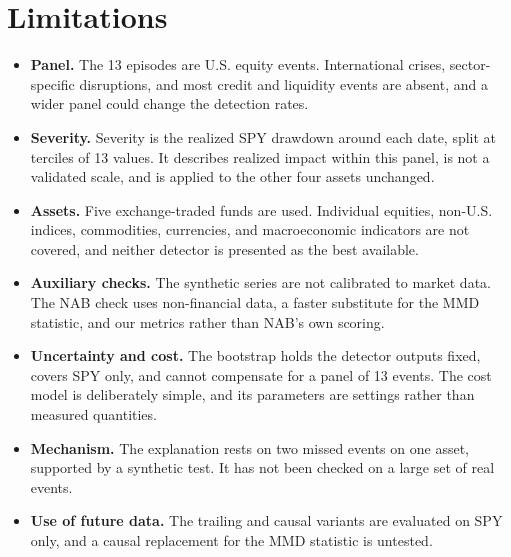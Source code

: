 \documentclass[pdflatex,sn-mathphys-num,iicol]{sn-jnl}
\begin{document}
\section{Limitations}
\label{sec:limits}
\begin{itemize}
\item \textbf{Panel.} The 13 episodes are U.S. equity events. International crises, sector-specific disruptions, and most credit and liquidity events are absent, and a wider panel could change the detection rates.
\item \textbf{Severity.} Severity is the realized SPY drawdown around each date, split at terciles of 13 values. It describes realized impact within this panel, is not a validated scale, and is applied to the other four assets unchanged.
\item \textbf{Assets.} Five exchange-traded funds are used. Individual equities, non-U.S. indices, commodities, currencies, and macroeconomic indicators are not covered, and neither detector is presented as the best available.
\item \textbf{Auxiliary checks.} The synthetic series are not calibrated to market data. The NAB check uses non-financial data, a faster substitute for the MMD statistic, and our metrics rather than NAB's own scoring.
\item \textbf{Uncertainty and cost.} The bootstrap holds the detector outputs fixed, covers SPY only, and cannot compensate for a panel of 13 events. The cost model is deliberately simple, and its parameters are settings rather than measured quantities.
\item \textbf{Mechanism.} The explanation rests on two missed events on one asset, supported by a synthetic test. It has not been checked on a large set of real events.
\item \textbf{Use of future data.} The trailing and causal variants are evaluated on SPY only, and a causal replacement for the MMD statistic is untested.
\end{itemize}
\end{document}
